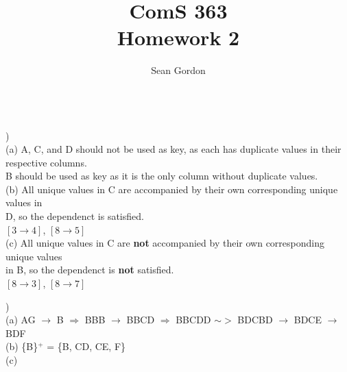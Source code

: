 \documentclass[12pt]{article}
\title{ComS 363\\Homework 2}
\author{Sean Gordon}
\begin{document}
\maketitle


\hrulefill \\



)\\
\indent \indent (a) A, C, and D should not be used as key, as each has duplicate values in their\\ 
\indent \indent respective columns.\\
\indent \indent B should be used as key as it is the only column without duplicate values.\\

\indent (b) All unique values in C are accompanied by their own corresponding unique values in \\
\indent \indent D, so the dependenct is satisfied.\\
\indent \indent $[3 \rightarrow 4]$, $[8 \rightarrow 5]$\\

\indent (c) All unique values in C are \textbf{not} accompanied by their own corresponding unique values\\
\indent \indent in B, so the dependenct is \textbf{not} satisfied.\\
\indent \indent $[8 \rightarrow 3]$, $[8 \rightarrow 7]$\\


\hrulefill


)\\
\indent \indent (a) AG $\rightarrow$ B $\Rightarrow$ BBB $\rightarrow$ BBCD $\Rightarrow$ BBCDD $\sim>$ BDCBD $\rightarrow$ BDCE $\rightarrow$ BDF\\

\indent \indent (b) \{B\}$^+$ = \{B, CD, CE, F\}\\

\indent \indent (c) 
\end{document}

